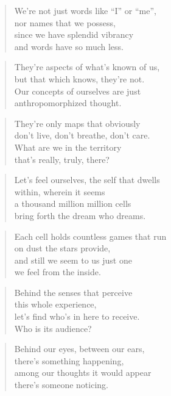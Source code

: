 \documentclass[14pt,a4paper]{article}
\begin{document}
\begin{verse}
We’re not just words like “I” or “me”,\\
nor names that we possess,\\
since we have splendid vibrancy\\
and words have so much less.
\end{verse}

\begin{verse}
They’re aspects of what’s known of us,\\
but that which knows, they’re not.\\
Our concepts of ourselves are just\\
anthropomorphized thought.
\end{verse}

\begin{verse}
They’re only maps that obviously\\
don’t live, don’t breathe, don’t care.\\
What are we in the territory\\
that’s really, truly, there?
\end{verse}

\begin{verse}
Let’s feel ourselves, the self that dwells\\
within, wherein it seems\\
a thousand million million cells\\
bring forth the dream who dreams.
\end{verse}

\begin{verse}
Each cell holds countless games that run\\
on dust the stars provide,\\
and still we seem to us just one\\
we feel from the inside.
\end{verse}

\begin{verse}
Behind the senses that perceive\\
this whole experience,\\
let’s find who’s in here to receive.\\
Who is its audience?
\end{verse}

\begin{verse}
Behind our eyes, between our ears,\\
there’s something happening,\\
among our thoughts it would appear\\
there’s someone noticing.
\end{verse}
\end{document}
